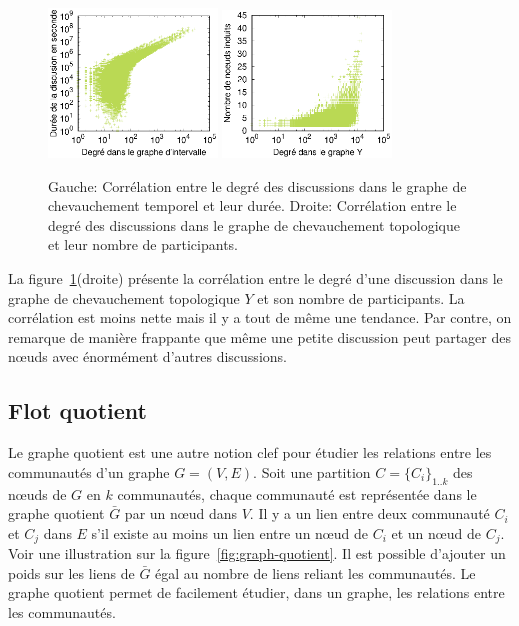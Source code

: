 \begin{figure}
\centering
	\includegraphics[width=0.4\textwidth]{img/mailing/degree_temp}
	\hspace*{0.025\textwidth}
	\includegraphics[width=0.4\textwidth]{img/mailing/degree_nodes}
	\caption{Gauche: Corrélation entre le degré des discussions dans le graphe de chevauchement temporel et leur durée. Droite: Corrélation entre le degré des discussions dans le graphe de chevauchement topologique et leur nombre de participants.}
	\label{fig:x-y-graphs_discu}
\end{figure}

La figure~\ref{fig:x-y-graphs_discu}(droite) présente la corrélation entre le degré d'une discussion dans le graphe de chevauchement topologique $Y$ et son nombre de participants.
La corrélation est moins nette mais il y a tout de même une tendance.
Par contre, on remarque de manière frappante que même une petite discussion peut partager des n\oe{}uds avec énormément d'autres discussions.


\subsection{Flot quotient}

Le graphe quotient est une autre notion clef pour étudier les relations entre les communautés d'un graphe $G=(V,E)$.
Soit une partition $C= \{C_i\}_{1 .. k}$ des n\oe{}uds de $G$ en $k$ communautés, chaque communauté est représentée dans le graphe quotient $\bar{G}$ par un n\oe{}ud dans $V$.
Il y a un lien entre deux communauté $C_i$ et $C_j$ dans $E$ s'il existe au moins un lien entre un n\oe{}ud de $C_i$ et un n\oe{}ud de $C_j$.
Voir une illustration sur la figure~\ref{fig:graph-quotient}.
Il est possible d'ajouter un poids sur les liens de $\bar{G}$ égal au nombre de liens reliant les communautés.
Le graphe quotient permet de facilement étudier, dans un graphe, les relations entre les communautés.


